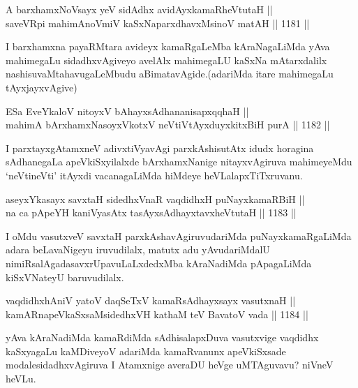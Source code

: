 
\begin{shl}
A barxhamxNoV\s sayx yeV sidAdhx avidAyxkamaRheVtutaH || \\
saveVR\s pi mahimAnoV\s miV kaSxNaparxdhavxMsinoV matAH ||  1181 ||  
\end{shl}

\begin{artha}
I barxhamxna payaRMtara avideyx kamaRgaLeMba kAraNagaLiMda yAva mahimegaLu sidadhxvAgiveyo avelAlx mahimegaLU kaSxNa mAtarxdalilx nashisuvaMtahavugaLeMbudu aBimatavAgide.(adariMda itare mahimegaLu tAyxjayxvAgive)
\end{artha}

\begin{shl}
ESa EveYkaloV nitoyxV bAhayxsAdhananisapxqqhaH || \\
mahimA bArxhamxNasoyxVkotxV neVtiVtAyxduyxkitxBiH purA ||  1182 ||  
\end{shl}

\begin{artha}
I parxtayxgAtamxneV adivxtiVyavAgi parxkAshisutAtx idudx horagina sAdhanegaLa apeVkiSxyilalxde bArxhamxNanige nitayxvAgiruva mahimeyeMdu `neVtineVti' itAyxdi vacanagaLiMda hiMdeye heVLalapxTiTxruvanu.
\end{artha}

\begin{shl}
aseyxYkasayx savxtaH sidedhxVnaR vaqdidhxH puNayxkamaRBiH || \\
na ca pApeYH kaniVyasAtx tasAyxsAdhayxtavxheVtutaH ||  1183 ||  
\end{shl}

\begin{artha}
I oMdu vasutxveV savxtaH parxkAshavAgiruvudariMda puNayxkamaRgaLiMda adara beLavaNigeyu iruvudilalx, matutx adu yAvudariMdalU nimiRsalAgadasavxrUpavuLaLxdedxMba kAraNadiMda pApagaLiMda kiSxVNateyU baruvudilalx.
\end{artha}


\begin{shl}
vaqdidhxhAniV yatoV daqSeTxV kamaRsAdhayxsayx vasutxnaH || \\
kamARnapeVkaSxsaMsidedhxVH kathaM teV BavatoV vada ||  1184 ||  
\end{shl}

\begin{artha}
yAva kAraNadiMda kamaRdiMda sAdhisalapxDuva vasutxvige vaqdidhx kaSxyagaLu kaMDiveyoV adariMda kamaRvanunx apeVkiSxsade modalesidadhxvAgiruva I Atamxnige averaDU heVge uMTAguvavu? niVneV heVLu.
\end{artha}

